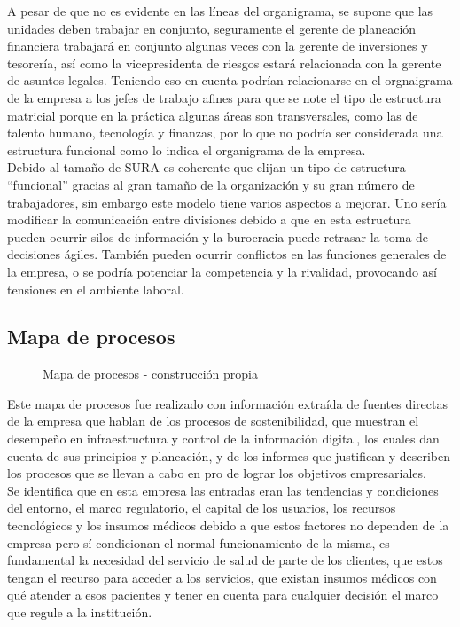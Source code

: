 \documentclass[onecolumn]{article} %
\begin{document}
	A pesar de que no es evidente en las líneas del organigrama, se supone que las unidades deben trabajar en conjunto, seguramente el gerente de planeación financiera trabajará en conjunto algunas veces con la gerente de inversiones y tesorería, así como la vicepresidenta de riesgos estará relacionada con la gerente de asuntos legales. Teniendo eso en cuenta podrían relacionarse en el orgnaigrama de la empresa a los jefes de trabajo afines para que se note el tipo de estructura matricial porque en la práctica algunas áreas son transversales, como las de talento humano, tecnología y finanzas, por lo que no podría ser considerada una estructura funcional como lo indica el organigrama de la empresa. \\
	
	Debido al tamaño de SURA es coherente que elijan un tipo de estructura ``funcional'' gracias al gran tamaño de la organización y su gran número de trabajadores, sin embargo este modelo tiene varios aspectos a mejorar. Uno sería modificar la comunicación entre divisiones debido a que en esta estructura pueden ocurrir silos de información y la burocracia puede retrasar la toma de decisiones ágiles. También pueden ocurrir conflictos en las funciones generales de la empresa, o se podría potenciar la competencia y la rivalidad, provocando así tensiones en el ambiente laboral.
	
	\subsection{Mapa de procesos}
	
	\begin{figure}[H]
		\centering
		
		\caption{Mapa de procesos - construcción propia}
	\end{figure}
	
	Este mapa de procesos fue realizado con información extraída de fuentes directas de la empresa que hablan de los procesos de sostenibilidad\cite{mp1}, que muestran el desempeño en infraestructura y control de la información digital\cite{mp2}, los cuales dan cuenta de sus principios y planeación\cite{mp3}, y de los informes que justifican y describen los procesos que se llevan a cabo en pro de lograr los objetivos empresariales\cite{mp4}.\\
	
	Se identifica que en esta empresa las entradas eran las tendencias y condiciones del entorno, el marco regulatorio, el capital de los usuarios, los recursos tecnológicos y los insumos médicos debido a que estos factores no dependen de la empresa pero sí condicionan el normal funcionamiento de la misma, es fundamental la necesidad del servicio de salud de parte de los clientes, que estos tengan el recurso para acceder a los servicios, que existan insumos médicos con qué atender a esos pacientes y tener en cuenta para cualquier decisión el marco que regule a la institución.\\
	
\end{document}

